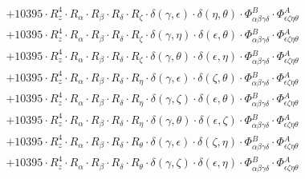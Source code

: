 \documentclass{article}
\begin{document}
\begin{equation}
\begin{array}{c}
 \\[0.2em] 		 + 10395 \cdot R_{z}^{4} \cdot R_{\alpha{}} \cdot R_{\beta{}} \cdot R_{\delta{}} \cdot R_{\zeta{}} \cdot \delta{}\left(\gamma{}, \epsilon{}\right) \cdot \delta{}\left(\eta{}, \theta{}\right) \cdot \Phi{}^{B}_{\alpha{}\beta{}\gamma{}\delta{}} \cdot \Phi{}^{A}_{\epsilon{}\zeta{}\eta{}\theta{}} 
 \\[0.2em] 		 + 10395 \cdot R_{z}^{4} \cdot R_{\alpha{}} \cdot R_{\beta{}} \cdot R_{\delta{}} \cdot R_{\zeta{}} \cdot \delta{}\left(\gamma{}, \eta{}\right) \cdot \delta{}\left(\epsilon{}, \theta{}\right) \cdot \Phi{}^{B}_{\alpha{}\beta{}\gamma{}\delta{}} \cdot \Phi{}^{A}_{\epsilon{}\zeta{}\eta{}\theta{}} 
 \\[0.2em] 		 + 10395 \cdot R_{z}^{4} \cdot R_{\alpha{}} \cdot R_{\beta{}} \cdot R_{\delta{}} \cdot R_{\zeta{}} \cdot \delta{}\left(\gamma{}, \theta{}\right) \cdot \delta{}\left(\epsilon{}, \eta{}\right) \cdot \Phi{}^{B}_{\alpha{}\beta{}\gamma{}\delta{}} \cdot \Phi{}^{A}_{\epsilon{}\zeta{}\eta{}\theta{}} 
 \\[0.2em] 		 + 10395 \cdot R_{z}^{4} \cdot R_{\alpha{}} \cdot R_{\beta{}} \cdot R_{\delta{}} \cdot R_{\eta{}} \cdot \delta{}\left(\gamma{}, \epsilon{}\right) \cdot \delta{}\left(\zeta{}, \theta{}\right) \cdot \Phi{}^{B}_{\alpha{}\beta{}\gamma{}\delta{}} \cdot \Phi{}^{A}_{\epsilon{}\zeta{}\eta{}\theta{}} 
 \\[0.2em] 		 + 10395 \cdot R_{z}^{4} \cdot R_{\alpha{}} \cdot R_{\beta{}} \cdot R_{\delta{}} \cdot R_{\eta{}} \cdot \delta{}\left(\gamma{}, \zeta{}\right) \cdot \delta{}\left(\epsilon{}, \theta{}\right) \cdot \Phi{}^{B}_{\alpha{}\beta{}\gamma{}\delta{}} \cdot \Phi{}^{A}_{\epsilon{}\zeta{}\eta{}\theta{}} 
 \\[0.2em] 		 + 10395 \cdot R_{z}^{4} \cdot R_{\alpha{}} \cdot R_{\beta{}} \cdot R_{\delta{}} \cdot R_{\eta{}} \cdot \delta{}\left(\gamma{}, \theta{}\right) \cdot \delta{}\left(\epsilon{}, \zeta{}\right) \cdot \Phi{}^{B}_{\alpha{}\beta{}\gamma{}\delta{}} \cdot \Phi{}^{A}_{\epsilon{}\zeta{}\eta{}\theta{}} 
 \\[0.2em] 		 + 10395 \cdot R_{z}^{4} \cdot R_{\alpha{}} \cdot R_{\beta{}} \cdot R_{\delta{}} \cdot R_{\theta{}} \cdot \delta{}\left(\gamma{}, \epsilon{}\right) \cdot \delta{}\left(\zeta{}, \eta{}\right) \cdot \Phi{}^{B}_{\alpha{}\beta{}\gamma{}\delta{}} \cdot \Phi{}^{A}_{\epsilon{}\zeta{}\eta{}\theta{}} 
 \\[0.2em] 		 + 10395 \cdot R_{z}^{4} \cdot R_{\alpha{}} \cdot R_{\beta{}} \cdot R_{\delta{}} \cdot R_{\theta{}} \cdot \delta{}\left(\gamma{}, \zeta{}\right) \cdot \delta{}\left(\epsilon{}, \eta{}\right) \cdot \Phi{}^{B}_{\alpha{}\beta{}\gamma{}\delta{}} \cdot \Phi{}^{A}_{\epsilon{}\zeta{}\eta{}\theta{}} 

\end{array}
\end{equation}
\end{document}
